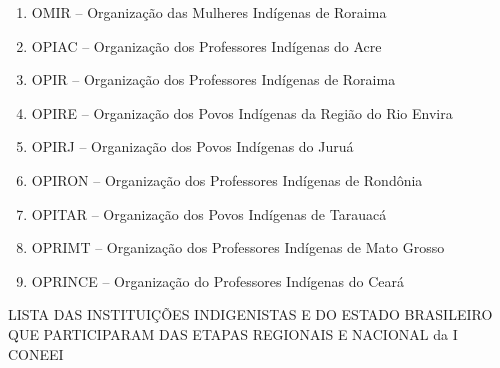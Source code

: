 \documentclass[
]{book}
\begin{document}
\begin{enumerate}
\item
  OMIR -- Organização das Mulheres Indígenas de Roraima
\item
  OPIAC -- Organização dos Professores Indígenas do Acre
\item
  OPIR -- Organização dos Professores Indígenas de Roraima
\item
  OPIRE -- Organização dos Povos Indígenas da Região do Rio Envira
\item
  OPIRJ -- Organização dos Povos Indígenas do Juruá
\item
  OPIRON -- Organização dos Professores Indígenas de Rondônia
\item
  OPITAR -- Organização dos Povos Indígenas de Tarauacá
\item
  OPRIMT -- Organização dos Professores Indígenas de Mato Grosso
\item
  OPRINCE -- Organização do Professores Indígenas do Ceará
\end{enumerate}

LISTA DAS INSTITUIÇÕES INDIGENISTAS E DO ESTADO BRASILEIRO QUE PARTICIPARAM DAS ETAPAS REGIONAIS E NACIONAL da I CONEEI
\end{document}
